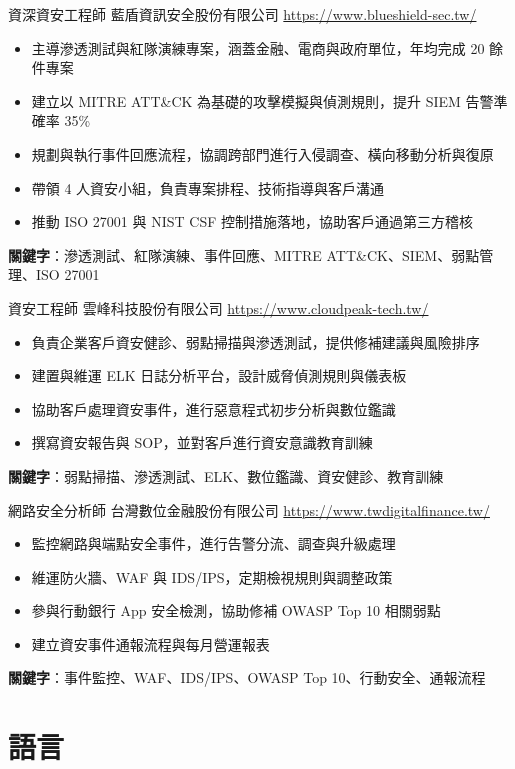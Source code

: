 \documentclass[a4paper, serif, 10pt]{moderncv}
\begin{document}
        {資深資安工程師}
        {藍盾資訊安全股份有限公司}
        {\url{https://www.blueshield-sec.tw/}}
        {}
        {\begin{itemize}
\item 主導滲透測試與紅隊演練專案，涵蓋金融、電商與政府單位，年均完成 20 餘件專案
\item 建立以 MITRE ATT\&CK 為基礎的攻擊模擬與偵測規則，提升 SIEM 告警準確率 35\%
\item 規劃與執行事件回應流程，協調跨部門進行入侵調查、橫向移動分析與復原
\item 帶領 4 人資安小組，負責專案排程、技術指導與客戶溝通
\item 推動 ISO 27001 與 NIST CSF 控制措施落地，協助客戶通過第三方稽核
\end{itemize}
\textbf{關鍵字}：滲透測試、紅隊演練、事件回應、MITRE ATT\&CK、SIEM、弱點管理、ISO 27001}

        {資安工程師}
        {雲峰科技股份有限公司}
        {\url{https://www.cloudpeak-tech.tw/}}
        {}
        {\begin{itemize}
\item 負責企業客戶資安健診、弱點掃描與滲透測試，提供修補建議與風險排序
\item 建置與維運 ELK 日誌分析平台，設計威脅偵測規則與儀表板
\item 協助客戶處理資安事件，進行惡意程式初步分析與數位鑑識
\item 撰寫資安報告與 SOP，並對客戶進行資安意識教育訓練
\end{itemize}
\textbf{關鍵字}：弱點掃描、滲透測試、ELK、數位鑑識、資安健診、教育訓練}

        {網路安全分析師}
        {台灣數位金融股份有限公司}
        {\url{https://www.twdigitalfinance.tw/}}
        {}
        {\begin{itemize}
\item 監控網路與端點安全事件，進行告警分流、調查與升級處理
\item 維運防火牆、WAF 與 IDS/IPS，定期檢視規則與調整政策
\item 參與行動銀行 App 安全檢測，協助修補 OWASP Top 10 相關弱點
\item 建立資安事件通報流程與每月營運報表
\end{itemize}
\textbf{關鍵字}：事件監控、WAF、IDS/IPS、OWASP Top 10、行動安全、通報流程}
\section{語言}
\end{document}
